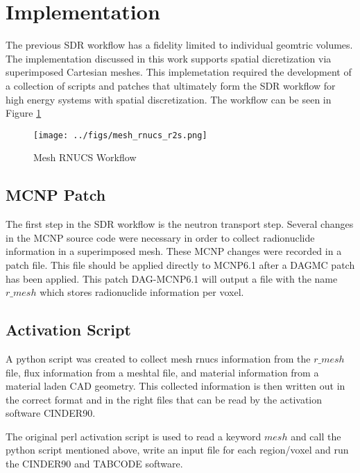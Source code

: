 \section{Implementation}
The previous SDR workflow has a fidelity limited to individual
geomtric volumes. The implementation discussed in this work
supports spatial dicretization via superimposed Cartesian meshes. 
This implemetation required the 
development of a collection of scripts and patches that 
ultimately form the SDR workflow for high energy systems 
with spatial discretization. The workflow can be seen in Figure
\ref{mesh_rnucs}

\begin{figure}[ht]
\begin{centering}
\texttt{[image: ../figs/mesh\_rnucs\_r2s.png]}
\caption{Mesh RNUCS Workflow}
\label{mesh_rnucs}
\end{centering}
\end{figure}


\subsection{MCNP Patch}
The first step in the SDR  workflow is the neutron transport step.
Several changes in the MCNP source code were necessary in order to 
collect radionuclide information in a superimposed mesh.
These MCNP changes were recorded in a patch file. This file should be applied 
directly to MCNP6.1 after a DAGMC patch has been applied.
This patch DAG-MCNP6.1 will output a file with the name $r\_mesh$ which stores 
radionuclide information per voxel. 

\subsection{Activation Script}
A python script was created to collect mesh rnucs information from the $r\_mesh$
file, flux information from a meshtal file, and material information from a 
material laden CAD geometry. This collected information is then written out 
in the correct format and in the right files that can be read by the activation 
software CINDER90. 

The original perl activation script is used to read a keyword $mesh$ and call the 
python script mentioned above, write an input file for each region/voxel and run 
the CINDER90 and TABCODE software. 

\newpage
